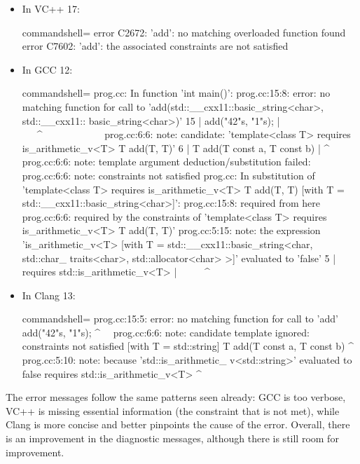 \begin{itemize}
\item
In VC++ 17:

\begin{tcblisting}{commandshell={}}
error C2672: 'add': no matching overloaded function found
error C7602: 'add': the associated constraints are not
satisfied
\end{tcblisting}

\item
In GCC 12:

\begin{tcblisting}{commandshell={}}
prog.cc: In function 'int main()':
prog.cc:15:8: error: no matching function for call
to 'add(std::__cxx11::basic_string<char>, std::__cxx11::
basic_string<char>)'
  15 |    add("42"s, "1"s);
     |     ~~~^~~~~~~~~~~~~
prog.cc:6:6: note: candidate: 'template<class T> 
requires is_arithmetic_v<T> T add(T, T)'
  6  |    T add(T const a, T const b)
     |      ^~~
prog.cc:6:6: note: template argument deduction/substitution
 failed:
prog.cc:6:6: note: constraints not satisfied
prog.cc: In substitution of 'template<class
T> requires is_arithmetic_v<T> T add(T, T) [with T =
std::__cxx11::basic_string<char>]':
prog.cc:15:8: required from here
prog.cc:6:6: required by the constraints of
'template<class T> requires is_arithmetic_v<T> T add(T,
T)'
prog.cc:5:15: note: the expression 'is_arithmetic_v<T>
[with T = std::__cxx11::basic_string<char, std::char_
traits<char>, std::allocator<char> >]' evaluated to 'false'
    5 | requires std::is_arithmetic_v<T>
      |               ~~~~~^~~~~~~~~~~~~~~~~~
\end{tcblisting}

\item
In Clang 13:

\begin{tcblisting}{commandshell={}}
prog.cc:15:5: error: no matching function for call to
'add'
add("42"s, "1"s);
^~~
prog.cc:6:6: note: candidate template ignored:
constraints not satisfied [with T = std::string]
T add(T const a, T const b)
^
prog.cc:5:10: note: because 'std::is_arithmetic_
v<std::string>' evaluated to false
requires std::is_arithmetic_v<T>
^
\end{tcblisting}
\end{itemize}

The error messages follow the same patterns seen already: GCC is too verbose, VC++ is missing essential information (the constraint that is not met), while Clang is more concise and better pinpoints the cause of the error. Overall, there is an improvement in the diagnostic messages, although there is still room for improvement.

